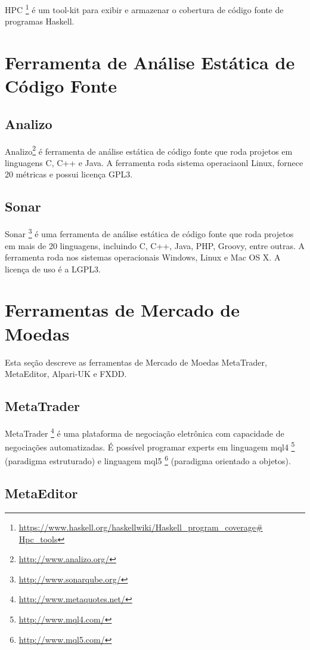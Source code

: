 HPC \footnote{\url{https://www.haskell.org/haskellwiki/Haskell_program_coverage\# Hpc_tools}} é um tool-kit para exibir e armazenar o cobertura de código fonte de programas Haskell.

\section{Ferramenta de Análise Estática de Código Fonte}

\subsection{Analizo}

Analizo\footnote{\url{ http://www.analizo.org/}}  é ferramenta de análise estática de código fonte que roda projetos em linguagens C, C++ e Java. A  ferramenta roda sistema operaciaonl Linux, fornece 20 métricas e possui licença GPL3.

\subsection{Sonar}

Sonar \footnote{\url{ http://www.sonarqube.org/}} é uma ferramenta de análise estática de código fonte que roda projetos em mais de 20 linguagens, incluindo C, C++, Java, PHP, Groovy, entre outras. A ferramenta roda nos sistemas operacionais Windows, Linux e Mac OS X. A licença de uso é a LGPL3.

\section{Ferramentas de Mercado de Moedas}

Esta seção descreve as ferramentas de Mercado de Moedas MetaTrader, MetaEditor, Alpari-UK e FXDD.

\subsection{MetaTrader}

MetaTrader \footnote{\url{http://www.metaquotes.net/}} é uma plataforma de negociação eletrônica com capacidade de negociações automatizadas. É possível programar experts em linguagem mql4 \footnote{\url{http://www.mql4.com/}} (paradigma estruturado)  e linguagem mql5 \footnote{\url{http://www.mql5.com/}} (paradigma orientado a objetos).

\subsection{MetaEditor}

